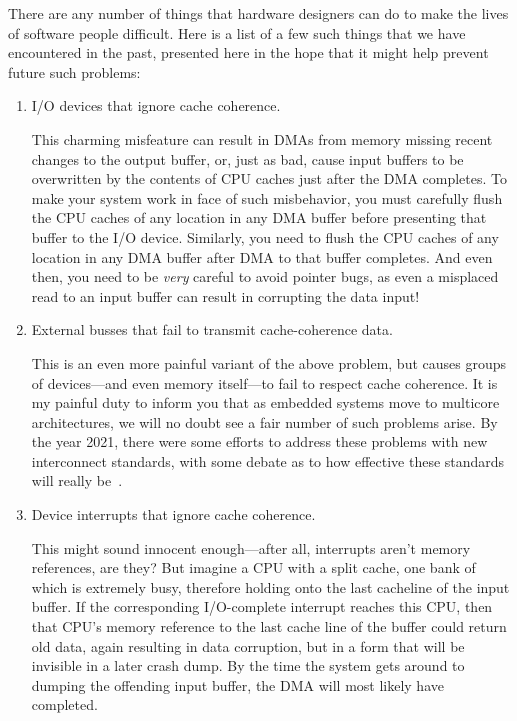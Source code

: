 There are any number of things that hardware designers can do
to make the lives of software people difficult.
Here is a list of a few such things that we have encountered in
the past, presented here in the hope that it might help prevent
future such problems:
\begin{enumerate}
\item	I/O devices that ignore cache coherence.

	This charming misfeature can result in DMAs from memory
	missing recent changes to the output buffer, or, just as
	bad, cause input buffers to be overwritten by the contents
	of CPU caches just after the DMA completes.
	To make your system work in face of such misbehavior,
	you must carefully flush the CPU caches of any location
	in any DMA buffer before presenting that buffer to the
	I/O device.
	Similarly, you need to flush the CPU caches of any location
	in any DMA buffer after DMA to that buffer completes.
	And even then, you need to be \emph{very} careful to avoid
	pointer bugs, as even a misplaced read to an input buffer
	can result in corrupting the data input!

\item	External busses that fail to transmit cache-coherence data.

	This is an even more painful variant of the above problem,
	but causes groups of devices---and even memory itself---to
	fail to respect cache coherence.
	It is my painful duty to inform you that as embedded systems
	move to multicore architectures, we will no doubt see a fair
	number of such problems arise.
	By the year 2021, there were some efforts to address
	these problems with new interconnect standards, with some
	debate as to how effective these standards will really
	be~\cite{WilliamGWong2019CCIX-CXL}.

\item	Device interrupts that ignore cache coherence.

	This might sound innocent enough---after all, interrupts
	aren't memory references, are they?
	But imagine a CPU with a split cache, one bank of which is
	extremely busy, therefore holding onto the last cacheline
	of the input buffer.
	If the corresponding I/O-complete interrupt reaches this
	CPU, then that CPU's memory reference to the last cache
	line of the buffer could return old data, again resulting
	in data corruption, but in a form that will be invisible
	in a later crash dump.
	By the time the system gets around to dumping the offending
	input buffer, the DMA will most likely have completed.


\end{enumerate}
